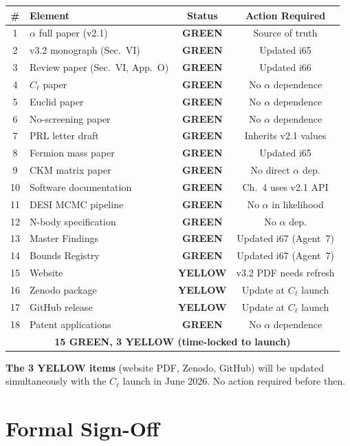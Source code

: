 \documentclass[11pt,a4paper]{article}
\newcommand{\GREEN}{\textcolor{dfdgreen}{\textbf{GREEN}}}
\newcommand{\YELLOW}{\textcolor{dfdyellow}{\textbf{YELLOW}}}
\begin{document}
\begin{center}
\begin{longtable}{clcc}
\toprule
\textbf{\#} & \textbf{Element} & \textbf{Status} & \textbf{Action Required} \\
\midrule
1 & $\alpha$ full paper (v2.1) & \GREEN & Source of truth \\
2 & v3.2 monograph (Sec.~VI) & \GREEN & Updated i65 \\
3 & Review paper (Sec.~VI, App.~O) & \GREEN & Updated i66 \\
4 & $C_\ell$ paper & \GREEN & No $\alpha$ dependence \\
5 & Euclid paper & \GREEN & No $\alpha$ dependence \\
6 & No-screening paper & \GREEN & No $\alpha$ dependence \\
7 & PRL letter draft & \GREEN & Inherits v2.1 values \\
8 & Fermion mass paper & \GREEN & Updated i65 \\
9 & CKM matrix paper & \GREEN & No direct $\alpha$ dep. \\
10 & Software documentation & \GREEN & Ch.~4 uses v2.1 API \\
11 & DESI MCMC pipeline & \GREEN & No $\alpha$ in likelihood \\
12 & N-body specification & \GREEN & No $\alpha$ dep. \\
13 & Master Findings & \GREEN & Updated i67 (Agent~7) \\
14 & Bounds Registry & \GREEN & Updated i67 (Agent~7) \\
15 & Website & \YELLOW & v3.2 PDF needs refresh \\
16 & Zenodo package & \YELLOW & Update at $C_\ell$ launch \\
17 & GitHub release & \YELLOW & Update at $C_\ell$ launch \\
18 & Patent applications & \GREEN & No $\alpha$ dependence \\
\midrule
\multicolumn{4}{c}{\textbf{15 GREEN, 3 YELLOW (time-locked to launch)}} \\
\bottomrule
\end{longtable}
\end{center}

\textbf{The 3 YELLOW items} (website PDF, Zenodo, GitHub) will be updated simultaneously with the $C_\ell$ launch in June 2026. No action required before then.

\section{Formal Sign-Off}
\end{document}
